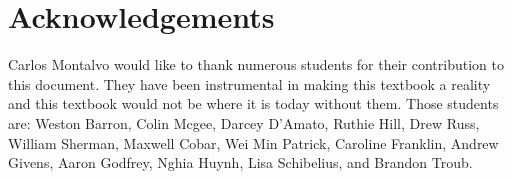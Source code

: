 \documentclass{article}
\begin{document}
\section*{Acknowledgements}

Carlos Montalvo would like to thank numerous students for their
contribution to this document. They have been instrumental in making
this textbook a reality and this textbook would not be where it is
today without them. Those students are: Weston Barron, Colin Mcgee,
Darcey D'Amato, Ruthie Hill, Drew Russ, William Sherman, Maxwell Cobar, Wei Min Patrick, Caroline
Franklin, Andrew Givens, Aaron Godfrey, Nghia Huynh, Lisa Schibelius,
and Brandon Troub.

\newpage

\tableofcontents

\newpage




















\end{document}
